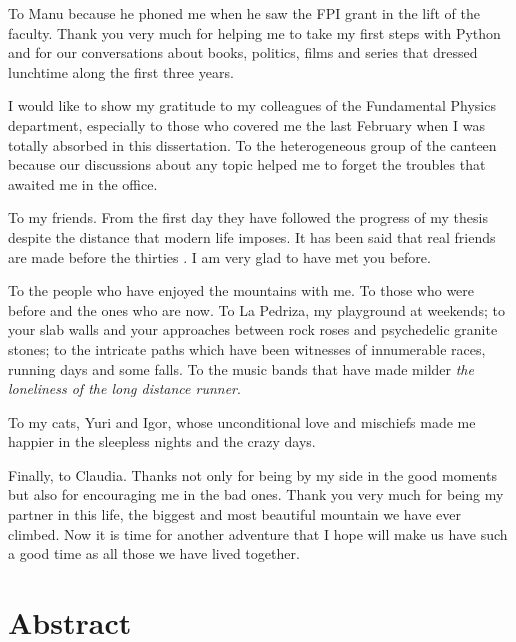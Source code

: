 \documentclass[b5paper,openright,10pt]{book}
\begin{document}
To Manu because he phoned me when he saw the FPI grant in the lift of the faculty. Thank you very much for helping me to take my first steps with Python and for our conversations about books, politics, films and series that dressed lunchtime along the first three years.

I would like to show my gratitude to my colleagues of the Fundamental Physics department, especially to those who covered me the last February when I was totally absorbed in this dissertation. To the heterogeneous group of the canteen because our discussions about any topic helped me to forget the troubles that awaited me in the office. 

To my friends. From the first day they have followed the progress of my thesis despite the distance that modern life imposes. It has been said that real friends are made before the thirties \cite{Llaneras2018}. I am very glad to have met you before. 

To the people who have enjoyed the mountains with me. To those who were before and the ones who are now. To La Pedriza, my playground at weekends; to your slab walls and your approaches between rock roses and psychedelic granite stones; to the intricate paths which have been witnesses of innumerable races, running days and some falls. To the music bands that have made milder {\it the loneliness of the long distance runner}. 

To my cats, Yuri and Igor, whose unconditional love and mischiefs made me happier in the sleepless nights and the crazy days. 

Finally, to Claudia. Thanks not only for being by my side in the good moments but also for encouraging me in the bad ones. Thank you very much for being my partner in this life, the biggest and most beautiful mountain we have ever climbed. Now it is time for another adventure that I hope will make us have such a good time as all those we have lived together. 


\pagestyle{Contents}  %
\tableofcontents %

\chapter*{Abstract} %
\pagestyle{noHeader}  %
\end{document}
